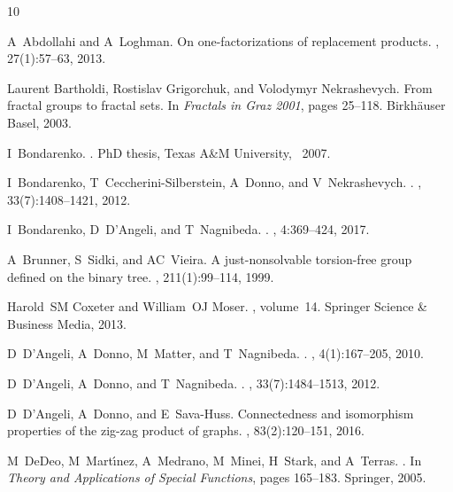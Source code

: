 \documentclass{article}
\begin{document}
\begin{thebibliography}{10}

A~Abdollahi and A~Loghman.
\newblock On one-factorizations of replacement products.
, 27(1):57--63, 2013.

Laurent Bartholdi, Rostislav Grigorchuk, and Volodymyr Nekrashevych.
\newblock From fractal groups to fractal sets.
\newblock In {\em Fractals in Graz 2001}, pages 25--118. Birkh{\"a}user Basel, 2003.

I~Bondarenko.
.
\newblock PhD thesis, Texas A\&M University, ~2007.

I~Bondarenko, T~Ceccherini-Silberstein, A~Donno, and V~Nekrashevych.
.
, 33(7):1408--1421, 2012.

I~Bondarenko, D~D'Angeli, and T~Nagnibeda.
.
, 4:369--424, 2017.

A~Brunner, S~Sidki, and AC~Vieira.
\newblock A just-nonsolvable torsion-free group defined on the binary tree.
, 211(1):99--114, 1999.

Harold~SM Coxeter and William~OJ Moser.
, volume~14.
\newblock Springer Science \& Business Media, 2013.

D~D'Angeli, A~Donno, M~Matter, and T~Nagnibeda.
.
, 4(1):167--205, 2010.

D~D'Angeli, A~Donno, and T~Nagnibeda.
.
, 33(7):1484--1513, 2012.

D~D'Angeli, A~Donno, and E~Sava-Huss.
\newblock Connectedness and isomorphism properties of the zig-zag product of graphs.
, 83(2):120--151, 2016.

M~DeDeo, M~Mart{\'\i}nez, A~Medrano, M~Minei, H~Stark, and A~Terras.
.
\newblock In {\em Theory and Applications of Special Functions}, pages {165--183}. Springer, 2005.


\end{thebibliography}
\end{document}

